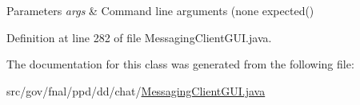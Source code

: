 \begin{DoxyParams}{Parameters}
{\em args} & Command line arguments (none expected() \\
\hline
\end{DoxyParams}


Definition at line 282 of file Messaging\-Client\-G\-U\-I.\-java.



The documentation for this class was generated from the following file\-:\begin{DoxyCompactItemize}
\item 
src/gov/fnal/ppd/dd/chat/\hyperlink{MessagingClientGUI_8java}{Messaging\-Client\-G\-U\-I.\-java}\end{DoxyCompactItemize}
